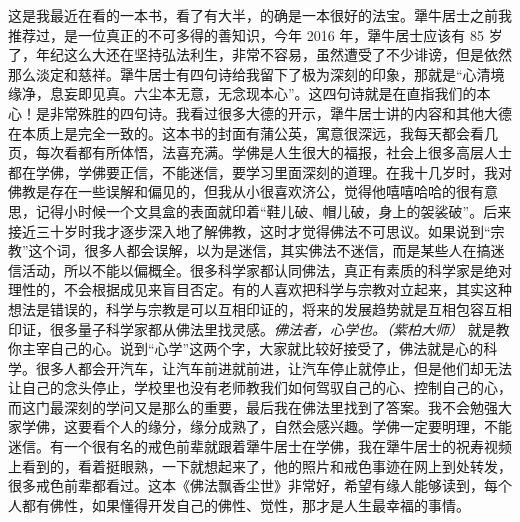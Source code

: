 \begin{book}
    这是我最近在看的一本书，看了有大半，的确是一本很好的法宝。犟牛居士之前我推荐过，是一位真正的不可多得的善知识，今年 2016 年，犟牛居士应该有 85 岁了，年纪这么大还在坚持弘法利生，非常不容易，虽然遭受了不少诽谤，但是依然那么淡定和慈祥。犟牛居士有四句诗给我留下了极为深刻的印象，那就是“心清境缘净，息妄即见真。六尘本无意，无念现本心”。这四句诗就是在直指我们的本心！是非常殊胜的四句诗。我看过很多大德的开示，犟牛居士讲的内容和其他大德在本质上是完全一致的。这本书的封面有蒲公英，寓意很深远，我每天都会看几页，每次看都有所体悟，法喜充满。学佛是人生很大的福报，社会上很多高层人士都在学佛，学佛要正信，不能迷信，要学习里面深刻的道理。在我十几岁时，我对佛教是存在一些误解和偏见的，但我从小很喜欢济公，觉得他嘻嘻哈哈的很有意思，记得小时候一个文具盒的表面就印着“鞋儿破、帽儿破，身上的袈裟破”。后来接近三十岁时我才逐步深入地了解佛教，这时才觉得佛法不可思议。如果说到“宗教”这个词，很多人都会误解，以为是迷信，其实佛法不迷信，而是某些人在搞迷信活动，所以不能以偏概全。很多科学家都认同佛法，真正有素质的科学家是绝对理性的，不会根据成见来盲目否定。有的人喜欢把科学与宗教对立起来，其实这种想法是错误的，科学与宗教是可以互相印证的，将来的发展趋势就是互相包容互相印证，很多量子科学家都从佛法里找灵感。\textit{佛法者，心学也。（紫柏大师）} 就是教你主宰自己的心。说到“心学”这两个字，大家就比较好接受了，佛法就是心的科学。很多人都会开汽车，让汽车前进就前进，让汽车停止就停止，但是他们却无法让自己的念头停止，学校里也没有老师教我们如何驾驭自己的心、控制自己的心，而这门最深刻的学问又是那么的重要，最后我在佛法里找到了答案。我不会勉强大家学佛，这要看个人的缘分，缘分成熟了，自然会感兴趣。学佛一定要明理，不能迷信。有一个很有名的戒色前辈就跟着犟牛居士在学佛，我在犟牛居士的祝寿视频上看到的，看着挺眼熟，一下就想起来了，他的照片和戒色事迹在网上到处转发，很多戒色前辈都看过。这本《佛法飘香尘世》非常好，希望有缘人能够读到，每个人都有佛性，如果懂得开发自己的佛性、觉性，那才是人生最幸福的事情。
\end{book}
